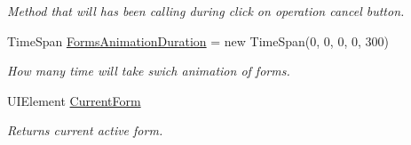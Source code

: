 \begin{DoxyCompactItemize}
\begin{DoxyCompactList}\small\item\em Method that will has been calling during click on operation cancel button. \end{DoxyCompactList}\item 
Time\+Span \mbox{\hyperlink{class_wpf_handler_1_1_u_i_1_1_controls_1_1_logon_1_1_logon_screen_a66c8e6dd59e6951a2ccf9889daaadde6}{Forms\+Animation\+Duration}} = new Time\+Span(0, 0, 0, 0, 300)
\begin{DoxyCompactList}\small\item\em How many time will take swich animation of forms. \end{DoxyCompactList}\item 
U\+I\+Element \mbox{\hyperlink{class_wpf_handler_1_1_u_i_1_1_controls_1_1_logon_1_1_logon_screen_a7e4c55e305734514eeedf6b387dad3ea}{Current\+Form}}
\begin{DoxyCompactList}\small\item\em Returns current active form. \end{DoxyCompactList}\end{DoxyCompactItemize}
